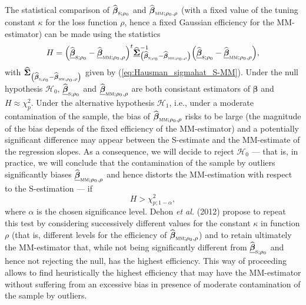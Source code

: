 The statistical comparison of $\sthat{\boldsymbol\beta}_{\stsc{S}%
;\rho_{0}}$ and $\sthat{\boldsymbol\beta}_{\stsc{MM};\rho_{0},\rho}$
(with a fixed value of the tuning constant $\kappa$ for the loss function
$\rho$, hence a fixed Gaussian efficiency for the MM-estimator) can be made
using the statistics
\begin{equation}
H=\left(  \sthat{\underline{\boldsymbol\beta}}_{\stsc{S};\rho_{0}%
}-\sthat{\underline{\boldsymbol\beta}}_{\stsc{MM};\rho_{0},\rho}\right)
^{t}\sthat{\underline{\boldsymbol{\Sigma}}}_{\left(  \widehat
{\boldsymbol\beta}_{\stsc{S};\rho_{0}}-\sthat{\boldsymbol\beta%
}_{\stsc{MM};\rho_{0},\rho}\right)  }^{-1}\left(  \sthat{\underline
{\boldsymbol\beta}}_{\stsc{S};\rho_{0}}-\sthat{\underline
{\boldsymbol\beta}}_{\stsc{MM};\rho_{0},\rho}\right)  ,
\label{Hausman_MMvsS}%
\end{equation}
with $\sthat{\boldsymbol{\Sigma}}_{\left(  \sthat{\boldsymbol\beta%
}_{\stsc{S};\rho_{0}}-\sthat{\boldsymbol\beta}_{\stsc{MM};\rho
_{0},\rho}\right)  }$ given by (\ref{eq:Hausman_sigmahat_S-MM}). Under the
null hypothesis $\mathcal{H}_{0}$, $\sthat{\underline{\boldsymbol\beta}%
}_{\stsc{S};\rho_{0}}$ and $\sthat{\underline{\boldsymbol\beta}%
}_{\stsc{MM};\rho_{0},\rho}$ are both consistant estimators of
\underline{$\boldsymbol\beta$} and $H\approx\chi_{p}^{2}$. Under the
alternative hypothesis $\mathcal{H}_{1}$, i.e., under a moderate contamination
of the sample, the bias of $\sthat{\boldsymbol\beta}_{\stsc{MM};\rho
_{0},\rho}$ risks to be large (the magnitude of the bias depends of the fixed
efficiency of the MM-estimator) and a potentially significant difference may
appear between the S-estimate and the MM-estimate of the regression slopes. As
a consequence, we will decide to reject $\mathcal{H}_{0}$ --- that is, in
practice, we will conclude that the contamination of the sample by outliers
significantly biases $\sthat{\underline{\boldsymbol\beta}}_{\stsc{MM}%
;\rho_{0},\rho}$ and hence distorts the MM-estimation with respect to the
S-estimation --- if
\[
H>\chi_{p;1-\alpha}^{2},
\]
where $\alpha$ is the chosen significance level. Dehon \textit{et al.} (2012)
propose to repeat this test by considering successively different values for
the constant $\kappa$ in function $\rho$ (that is, different levels for the
efficiency of $\sthat{\boldsymbol\beta}_{\stsc{MM};\rho_{0},\rho}$) and
to retain ultimately the MM-estimator that, while not being significantly
different from $\sthat{\underline{\boldsymbol\beta}}_{\stsc{S};\rho_{0}%
}$ and hence not rejecting the null, has the highest efficiency. This way of
proceeding allows to find heuristically the highest efficiency that may have
the MM-estimator without suffering from an excessive bias in presence of
moderate contamination of the sample by outliers.



